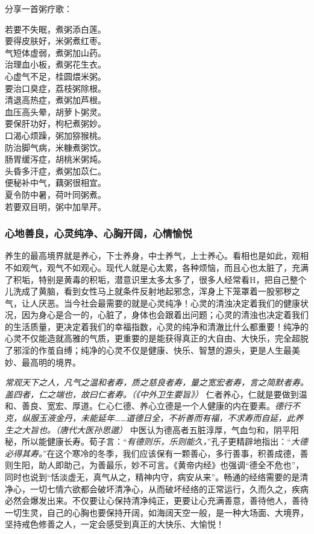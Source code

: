 分享一首粥疗歌：

\begin{multicols}{2}
    \begin{center}
        若要不失眠，煮粥添白莲。 \\ 要得皮肤好，米粥煮红枣。 \\ 气短体虚弱，煮粥加山药。 \\ 治理血小板，煮粥花生衣。 \\ 心虚气不足，桂圆煨米粥。 \\ 要治口臭症，荔枝粥除根。 \\ 清退高热症，煮粥加芦根。 \\ 血压高头晕，胡萝卜粥灵。 \\ 要保肝功好，枸杞煮粥妙。 \\ 口渴心烦躁，粥加猕猴桃。 \\ 防治脚气病，米糠煮粥饮。 \\ 肠胃缓泻症，胡桃米粥炖。 \\ 头昏多汗症，煮粥加苡仁。 \\ 便秘补中气，藕粥很相宜。 \\ 夏令防中暑，荷叶同粥煮。 \\ 若要双目明，粥中加旱芹。
    \end{center}
\end{multicols}

\subsubsection{心地善良，心灵纯净、心胸开阔，心情愉悦}

养生的最高境界就是养心，下士养身，中士养气，上士养心。看相也是如此，观相不如观气，观气不如观心。现代人就是心太累，各种烦恼，而且心也太脏了，充满了积垢，特别是黄毒的积垢，潜意识里太多太多了，很多人经常看H，把自己整个儿洗成了黄脑，看到女性马上就条件反射地起邪念，浑身上下笼罩着一股邪秽之气，让人厌恶。当今社会最需要的就是心灵纯净！心灵的清浊决定着我们的健康状况，因为身心是合一的，心脏了，身体也会跟着出问题；心灵的清浊也决定着我们的生活质量，更决定着我们的幸福指数，心灵的纯净和清澈比什么都重要！纯净的心灵不仅能造就高雅的气质，更重要的是能获得真正的大自由、大快乐，完全超脱了邪淫的作茧自缚；纯净的心灵不仅是健康、快乐、智慧的源头，更是人生最美妙、最高明的境界。

\textit{常观天下之人，凡气之温和者寿，质之慈良者寿，量之宽宏者寿，言之简默者寿。盖四者，仁之端也，故曰仁者寿。（《中外卫生要旨》）} 仁者养心，仁就是要做到温和、善良、宽宏、厚道。仁心仁德、养心立德是一个人健康的内在要素。\textit{德行不克，纵服玉液金丹，未能延年……道德日全，不祈善而有福，不求寿而自延，此养生之大旨也。（唐代大医孙思邈）} 中医认为德高者五脏淳厚，气血匀和，阴平阳秘，所以能健康长寿。荀子言：“\textit{有德则乐，乐则能久，}”孔子更精辟地指出：“\textit{大德必得其寿。}”在这个寒冷的冬季，我们应该保有一颗善心，多行善事，积善成德，善则生阳，助人即助己，为善最乐，妙不可言。《黄帝内经》也强调“德全不危也”，同时也说到“恬淡虚无，真气从之，精神内守，病安从来”。畅通的经络需要的是清净心，一切七情六欲都会破坏清净心，从而破坏经络的正常运行，久而久之，疾病必然会爆发出来。不仅要让心保持清净纯正，更要让心充满善意，善待他人，善待一切生灵，自己的心胸也要保持开阔，如海阔天空一般，是一种大场面、大境界，坚持戒色修善之人，一定会感受到真正的大快乐、大愉悦！

